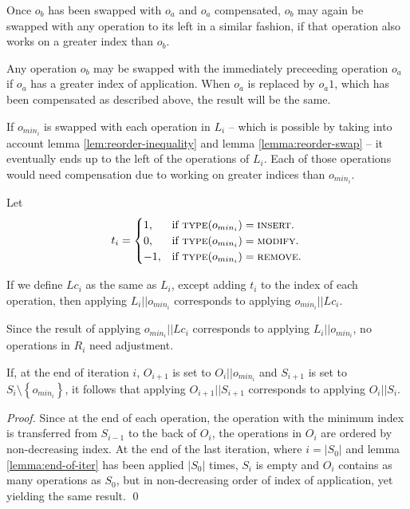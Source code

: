 Once $o_b$ has been swapped with $o_a$ and $o_a$ compensated, $o_b$ may again be
swapped with any operation to its left in a similar fashion, if that operation
also works on a greater index than $o_b$.

\begin{lemma}
\label{lemma:reorder-swap}

Any operation $o_b$ may be swapped with the immediately preceeding operation
$o_a$ if $o_a$ has a greater index of application. When $o_a$ is replaced by
$o_a1$, which has been compensated as described above, the result will be the
same.
\end{lemma}

If $o_{min_i}$ is swapped with each operation in $L_i$ -- which is possible by
taking into account lemma \ref{lem:reorder-inequality} and lemma
\ref{lemma:reorder-swap} -- it eventually ends up to the left of the operations
of $L_i$. Each of those operations would need compensation due to working on
greater indices than $o_{min_i}$.

Let
\begin{equation*}
  t_i = 
  \begin{cases}
      1, & \text{if $\textsc{type}(o_{min_i}) = \textsc{insert}$}.\\
      0, & \text{if $\textsc{type}(o_{min_i}) = \textsc{modify}$}.\\
      -1, & \text{if $\textsc{type}(o_{min_i}) = \textsc{remove}$}.
  \end{cases}
\end{equation*}

If we define $Lc_i$ as the same as $L_i$, except adding $t_i$ to the index of
each operation, then applying $L_i || o_{min_i}$ corresponds to applying
$o_{min_i} || Lc_i$.

Since the result of applying $o_{min_i} || Lc_i$ corresponds to applying
$L_i || o_{min_i}$, no operations in $R_i$ need adjustment.

\begin{lemma}
\label{lemma:end-of-iter}

If, at the end of iteration $i$, $O_{i+1}$ is set to $O_i || o_{min_i}$ and
$S_{i+1}$ is set to $S_i \setminus \left\{o_{min_i}\right\}$, it follows that
applying $O_{i+1} || S_{i+1}$ corresponds to applying $O_i || S_i$.

\end{lemma}

\begin{proof}

Since at the end of each operation, the operation with the minimum index is
transferred from $S_{i-1}$ to the back of $O_i$, the operations in $O_i$ are
ordered by non-decreasing index. At the end of the last iteration, where
$i=\left|S_0\right|$ and lemma \ref{lemma:end-of-iter} has been applied
$\left|S_0\right|$ times, $S_i$ is empty and $O_i$ contains as many operations
as $S_0$, but in non-decreasing order of index of application, yet yielding the
same result. \qed

\end{proof}

